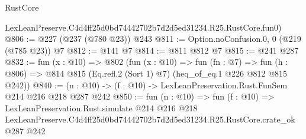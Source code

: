 \begin{lexlean}{RustCore}
\begin{coremodule}
    LexLeanPreserve.C4d4ff25d0bd74442702b7d2d5ed31234.R25.RustCore.fun0)
@806 := @227 (@237 (@780 @23)) @243
@811 := Option.noConfusion.{0, 0} (@219 (@785 @23)) @7
@812 := @141 @7
@814 := @811 @812 @7
@815 := @241 @287
@832 := fun (x : @10) =>
  @802
    (fun (x : @10) =>
    fun (fn : @7) =>
    fun (h : @806) => @814 @815 (Eq.refl.{2} (Sort 1) @7) (heq_of_eq.{1} @226 @812 @815 @242))
@840 := (n : @10) -> (f : @10) -> LexLeanPreservation.Rust.FunSem @214 @216 @218 @287 @242
@850 := fun (n : @10) =>
  fun (f : @10) =>
  LexLeanPreservation.Rust.simulate
    @214
    @216
    @218
    LexLeanPreserve.C4d4ff25d0bd74442702b7d2d5ed31234.R25.RustCore.crate_ok
    @287
    @242
\end{coremodule}
\end{lexlean}
